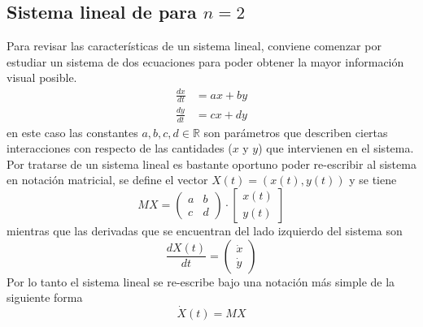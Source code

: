 \newpage
\subsection{Sistema lineal de para $n=2$}

Para revisar las características de un sistema lineal, conviene comenzar por estudiar un sistema de dos ecuaciones para poder obtener la mayor información visual posible.
\begin{align*}
	\frac{dx}{dt} &= ax + by \\
	\frac{dy}{dt} &= cx + dy
\end{align*}
en este caso las constantes $a,b,c,d\in\mathbb{R}$ son parámetros que describen ciertas interacciones con respecto de las cantidades ($x$ y $y$) que intervienen en el sistema. Por tratarse de un sistema lineal es bastante oportuno poder re-escribir al sistema en notación matricial, se define el vector $X(t)=(x(t),y(t))$ y se tiene
$$
MX = \begin{pmatrix}
	a & b\\
	c & d
\end{pmatrix}\cdot\begin{bmatrix}
x(t)\\
y(t)
\end{bmatrix}
$$
mientras que las derivadas que se encuentran del lado izquierdo del sistema son
$$
\frac{dX(t)}{dt}=\begin{pmatrix}
	\dot{x}\\
	\dot{y}
\end{pmatrix}
$$
Por lo tanto el sistema lineal se re-escribe bajo una notación más simple de la siguiente forma
\begin{equation}
	\dot{X}(t)=MX
\end{equation}




